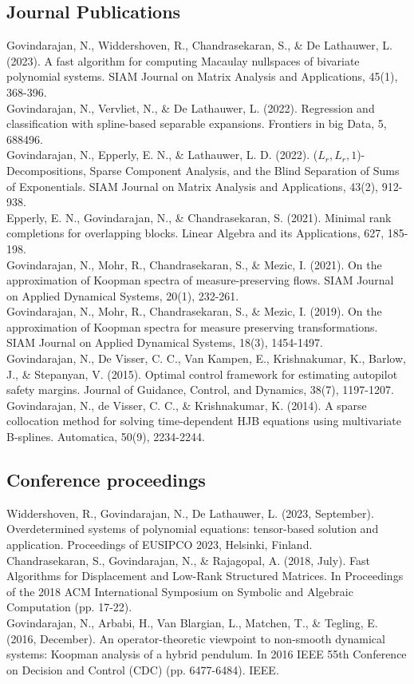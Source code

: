 \documentclass[10pt, a4paper]{article}
\newcommand{\years}[1]{\marginnote{\scriptsize #1} }
\begin{document}
\subsection*{Journal Publications}
\years{2024}Govindarajan, N., Widdershoven, R., Chandrasekaran, S., \& De Lathauwer, L. (2023). A fast algorithm for computing Macaulay nullspaces of bivariate polynomial systems. SIAM Journal on Matrix Analysis and Applications, 45(1), 368-396. \\
\years{2022}Govindarajan, N., Vervliet, N., \& De Lathauwer, L. (2022). Regression and classification with spline-based separable expansions. Frontiers in big Data, 5, 688496.  \\
\years{2022}Govindarajan, N., Epperly, E. N., \& Lathauwer, L. D. (2022). ($L_r,L_r,1$)-Decompositions, Sparse Component Analysis, and the Blind Separation of Sums of Exponentials. SIAM Journal on Matrix Analysis and Applications, 43(2), 912-938. \\
\years{2021}Epperly, E. N., Govindarajan, N., \& Chandrasekaran, S. (2021). Minimal rank completions for overlapping blocks. Linear Algebra and its Applications, 627, 185-198.  \\
\years{2021}Govindarajan, N., Mohr, R., Chandrasekaran, S., \& Mezic, I. (2021). On the approximation of Koopman spectra of measure-preserving flows. SIAM Journal on Applied Dynamical Systems, 20(1), 232-261. \\
\years{2019}Govindarajan, N., Mohr, R., Chandrasekaran, S., \& Mezic, I. (2019). On the approximation of Koopman spectra for measure preserving transformations. SIAM Journal on Applied Dynamical Systems, 18(3), 1454-1497. \\
\years{2015}Govindarajan, N., De Visser, C. C., Van Kampen, E., Krishnakumar, K., Barlow, J., \& Stepanyan, V. (2015). Optimal control framework for estimating autopilot safety margins. Journal of Guidance, Control, and Dynamics, 38(7), 1197-1207. \\
\years{2014} Govindarajan, N., de Visser, C. C., \& Krishnakumar, K. (2014). A sparse collocation method for solving time-dependent HJB equations using multivariate B-splines. Automatica, 50(9), 2234-2244.  

\subsection*{Conference proceedings}
\years{2023} Widdershoven, R., Govindarajan, N., De Lathauwer, L. (2023, September). Overdetermined systems of polynomial equations: tensor-based solution and application. Proceedings of EUSIPCO 2023, Helsinki, Finland. \\
\years{2018} Chandrasekaran, S., Govindarajan, N., \& Rajagopal, A. (2018, July). Fast Algorithms for Displacement and Low-Rank Structured Matrices. In Proceedings of the 2018 ACM International Symposium on Symbolic and Algebraic Computation (pp. 17-22). \\
\years{2016} Govindarajan, N., Arbabi, H., Van Blargian, L., Matchen, T., \& Tegling, E. (2016, December). An operator-theoretic viewpoint to non-smooth dynamical systems: Koopman analysis of a hybrid pendulum. In 2016 IEEE 55th Conference on Decision and Control (CDC) (pp. 6477-6484). IEEE.  
\end{document}
